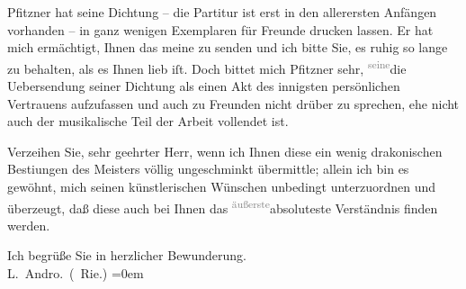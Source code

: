 \pstart
           Pfitzner hat seine Dichtung – die Partitur ist erst in den
               allerersten Anfängen vorhanden – in ganz wenigen Exemplaren für Freunde drucken
               lassen. Er hat mich ermächtigt, Ihnen das meine zu senden und ich bitte Sie, es ruhig
               so lange zu behalten, als es Ihnen lieb iſt. Doch bittet mich Pfitzner sehr, \substVorne{}\textsuperscript{\textcolor{gray}{seine}}\substDazwischen{}die Ueber\substHinten{}sendung seiner Dichtung als einen Akt des innigsten persönlichen Vertrauens aufzufassen und
               auch zu Freunden nicht drüber zu sprechen, ehe nicht auch der musikalische Teil der
               Arbeit vollendet ist.\pend
           
\pstart
           Verzeihen Sie, sehr geehrter Herr, wenn ich Ihnen diese ein wenig drakonischen
                  Besti{\geminationm}ungen des Meisters völlig ungeschminkt übermittle; allein ich bin es
               gewöhnt, mich seinen künstlerischen Wünschen unbedingt unterzuordnen und überzeugt,
               daß diese auch bei Ihnen das {\pb}\substVorne{}\textsuperscript{\textcolor{gray}{äußerste}}\substDazwischen{}absoluteste\substHinten{} Verständnis finden werden.\pend
           
\pstart
           Ich begrüße Sie in herzlicher Bewunderung.{\\[\baselineskip]}\spacefill\mbox{L. Andro. (\label{K_L02569-1v}\label{K_L02569-1} Rie.)}\pend
           \leftskip=0em{}\endnumbering{}  \newcommand{\dateiname}{L02569}\newcommand{\titel}{Therese Rie-Andro an Arthur Schnitzler, 6. 2. 1912}\newcommand{\editorInnen}{Martin Anton Müller und Gerd-Hermann Susen}
